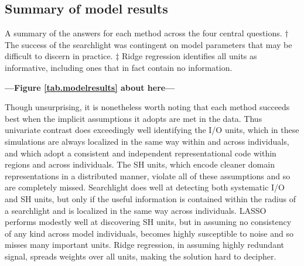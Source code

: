 \subsection{Summary of model results}
\begin{table}

\caption{A summary of the answers for each method across the four central questions. $\dagger$ The success of the searchlight was contingent on model parameters that may be difficult to discern in practice. $\ddagger$ Ridge regression identifies all units as informative, including ones that in fact contain no information.} 
\label{tab.modelresults}
\end{table}
\begin{center}
	\textbf{---Figure \ref{tab.modelresults} about here---}
\end{center}


Though unsurprising, it is nonetheless worth noting that each method succeeds best when the implicit assumptions it adopts are met in the data. Thus univariate contrast does exceedingly well identifying the I/O units, which in these simulations are always localized in the same way within and across individuals, and which adopt a consistent and independent representational code within regions and across individuals. The SH units, which encode cleaner domain representations in a distributed manner, violate all of these assumptions and so are completely missed. Searchlight does well at detecting both systematic I/O and SH units, but only if the useful information is contained within the radius of a searchlight and is localized in the same way across individuals. LASSO performs modestly well at discovering SH units, but in assuming no consistency of any kind across model individuals, becomes highly susceptible to noise and so misses many important units. Ridge regression, in assuming highly redundant signal, spreads weights over all units, making the solution hard to decipher.

